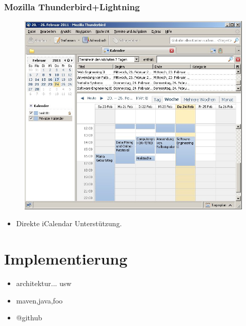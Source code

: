 \documentclass{beamer}
\begin{document}
\begin{frame}\frametitle{Mozilla Thunderbird+Lightning}
  \begin{figure}
    \centering
    \includegraphics[height=0.6\paperheight]{images/dhbwcalendar-lightning.jpg}
  \end{figure}
  \begin{itemize}
    \item Direkte iCalendar Unterstützung.
  \end{itemize}
\end{frame}

\section{Implementierung}
\begin{frame}
\begin{itemize}
\item architektur... usw
\item maven,java,foo
\item @github
\end{itemize}
\end{frame}


\end{document}

